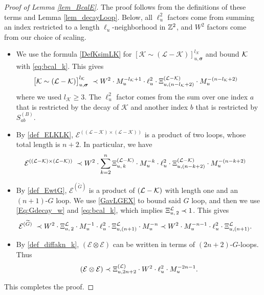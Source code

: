  \begin{proof}[Proof of Lemma \ref{lem_BcalE}] The proof  follows from  the definitions of these terms and Lemma \ref{lem_decayLoop}. Below, all  $\ell_u^{2}$ factors come from summing an index restricted to a length $\ell_u$-neighborhood in $\mathbb{Z}^{2}$, and $W^{2}$ factors come from our choice of scaling.
     \begin{itemize}
    \item We use the formula \eqref{DefKsimLK} for $[\mathcal{K} \sim(\mathcal{L}-\mathcal{K})]_{u, \boldsymbol{\sigma}}^{l_{\mathcal{K}}}$ and bound $\cal K$  with \eqref{eq:bcal_k}. This gives  
    \begin{align}
    \big[\mathcal{K} \sim(\mathcal{L}-\mathcal{K})\big]_{u, \boldsymbol{\sigma}}^{l_{\mathcal{K}}}
 \; \prec \; &
 W^{2}\cdot M_{u}^{-l_{\mathcal{K}}+1}\cdot \ell_u^{2}\cdot \Xi^{(\cal L-\cal K)}_{u,(n-l_{\mathcal{K}}+2)}\cdot M_{u}^{-(n-l_{\mathcal{K}}+2)}
    \end{align}
    where we used $l_{\mathcal{K}}\ge 3$. The $\ell_u^{2}$ factor comes from the sum over one index $a$ that is restricted by the decay of $\mathcal K$ and another index $b$ that is restricted by $S^{(B)}_{ab}$.
    
    \item By \eqref{def_ELKLK},  $ \mathcal{E}^{((\mathcal{L} - \mathcal{K}) \times (\mathcal{L} - \mathcal{K}))}$ is a product of two loops, whose total length is $n+2$. In particular, we have
    \begin{align}
   \mathcal{E}^{((\mathcal{L} - \mathcal{K}) \times (\mathcal{L} - \mathcal{K}))}
 \; \prec \; &
 W^{2}\cdot \sum_{k=2}^{n} \Xi^{(\cal L-\cal K)}_{u, \,k}
 \cdot M_{u}^{-k}
 \cdot \ell_u^{2}\cdot \Xi^{(\cal L-\cal K)}_{u,(n-k+2)}
 \cdot M_{u}^{-(n-k+2)}
      \end{align}
    
    \item By \eqref{def_EwtG}, 
    $\mathcal{E}^{(\widetilde{G})}$  is a product of $(\cal L-\cal K)$ with length one and an $(n+1)$-$G$  loop. We use  \eqref{GavLGEX} to bound said $G$ loop, and then we use \eqref{Eq:Gdecay_w} and \eqref{eq:bcal_k}, which implies $\Xi^{\cal L }_{u, \,2}\prec 1$. This gives 
    \begin{align}
  \mathcal{E}^{(\widetilde{G})}
 \; \prec \; &
 W^{2}\cdot   \Xi^{\cal L }_{u, \,2}
 \cdot M_{u}^{-1}
 \cdot \ell_u^{2}\cdot \Xi^{\cal L }_{u,(n+1)}
 \cdot M_{u}^{-n} \prec W^{2}   
 \cdot M_{u}^{-n-1}
 \cdot \ell_u^{2}\cdot \Xi^{\cal L }_{u,(n+1)}.
    \end{align} 
 \item By  \eqref{def_diffakn_k}, 
    $(\mathcal{E} \otimes \mathcal{E})$ can be written in terms of  $(2n+2)$-$G$-loops.  Thus 
    \begin{align}
(\mathcal{E} \otimes \mathcal{E}) \prec  \Xi^{(\cal L)}_{u, {2n+2}}\cdot  W^{2}\cdot\ell_u^{2}\cdot  M_{u}^{-2n-1 } .
    \end{align} 
\end{itemize}
This completes the proof.
 \end{proof}

